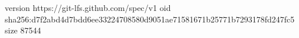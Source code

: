 version https://git-lfs.github.com/spec/v1
oid sha256:d7f2abd4d7bdd6ee33224708580d9051ae71581671b25771b7293178fd247fc5
size 87544
